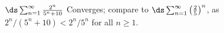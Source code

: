 {$\ds \sum_{n=1}^\infty \frac{2^n}{5^n+10}$
}
{Converges; compare to $\ds \sum_{n=1}^\infty \left(\frac{2}{5}\right)^n$, as $2^n/(5^n+10) < 2^n/5^n$ for all $n\geq 1$. 
}
